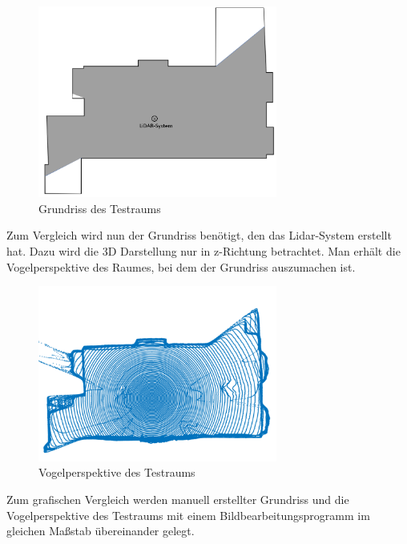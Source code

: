 \begin{figure}[H]
	\centering
	\includegraphics[width=0.7\textwidth]{images/Validierung/MitSchatten}
	\caption{Grundriss des Testraums}
	\label{grundrssmitschatte}
\end{figure}


Zum Vergleich wird nun der Grundriss benötigt, den das Lidar-System erstellt hat. Dazu wird die 3D Darstellung nur in z-Richtung betrachtet. Man erhält die Vogelperspektive des Raumes, bei dem der Grundriss auszumachen ist. 

\begin{figure}[H]
	\centering
	\includegraphics[width=0.7\textwidth]{images/Validierung/Vogelperspektive}
	\caption{Vogelperspektive des Testraums}
	\label{vogelperspektive}
\end{figure}


Zum grafischen Vergleich werden manuell erstellter Grundriss und die Vogelperspektive des Testraums mit einem Bildbearbeitungsprogramm im gleichen Maßstab übereinander gelegt.

